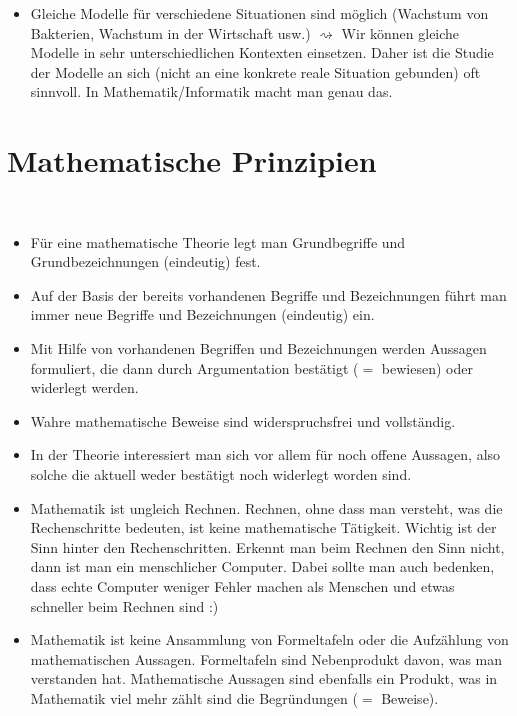 \begin{bem}
\begin{itemize}
\begin{itemize}
			\item Gleiche Modelle für verschiedene Situationen sind möglich (Wachstum von Bakterien, Wachstum in der Wirtschaft usw.) $\rightsquigarrow$ Wir können gleiche Modelle in sehr unterschiedlichen Kontexten einsetzen. Daher ist die Studie der Modelle an sich (nicht an eine konkrete reale Situation gebunden) oft sinnvoll. In Mathematik/Informatik macht man genau das. 
		\end{itemize} 
	\end{itemize} 
\end{bem}


\section{Mathematische Prinzipien} 

\begin{bem}\ 
	\begin{itemize}
		\item Für eine mathematische Theorie legt man Grundbegriffe und Grundbezeichnungen (eindeutig) fest. 
		\item Auf der Basis der bereits vorhandenen Begriffe und Bezeichnungen führt man immer neue Begriffe und Bezeichnungen (eindeutig) ein. 
		\item Mit Hilfe von vorhandenen Begriffen und Bezeichnungen werden Aussagen formuliert, die dann durch Argumentation bestätigt ($=$ bewiesen) oder widerlegt werden. 
		\item Wahre mathematische Beweise sind widerspruchsfrei und vollständig. 
		\item In der Theorie interessiert man sich vor allem für noch offene Aussagen, also solche die aktuell weder bestätigt noch widerlegt worden sind. 
		\item Mathematik ist ungleich Rechnen. Rechnen, ohne dass man versteht, was die Rechenschritte bedeuten, ist keine mathematische Tätigkeit. Wichtig ist der Sinn hinter den Rechenschritten. Erkennt man beim Rechnen den Sinn nicht, dann ist man ein menschlicher Computer. Dabei sollte man auch bedenken, dass echte Computer weniger Fehler machen als Menschen und etwas schneller beim Rechnen sind :) 
		\item Mathematik ist keine Ansammlung von Formeltafeln oder die Aufzählung von mathematischen Aussagen. Formeltafeln sind Nebenprodukt davon, was man verstanden hat. Mathematische Aussagen sind ebenfalls ein Produkt, was in Mathematik viel mehr zählt sind die Begründungen ($=$ Beweise). 
	\end{itemize} 
\end{bem} 


